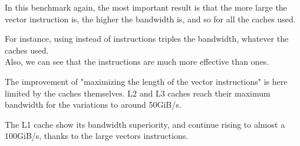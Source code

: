 
In this benchmark again, the most important result is that the more large the vector instruction is, the higher the bandwidth is, and so for all the caches used.

For instance, using  instead of  instructions triples the bandwidth, whatever the caches used.\\


Also, we can see that the  instructions are much more effective than  ones.

The improvement of "maximizing the length of the vector instructions" is here limited by the caches themselves. L2 and L3 caches reach their maximum bandwidth for the variations  to  around 50GiB/s.

The L1 cache show its bandwidth superiority, and continue rising to almost a 100GiB/s, thanks to the large vectors instructions.